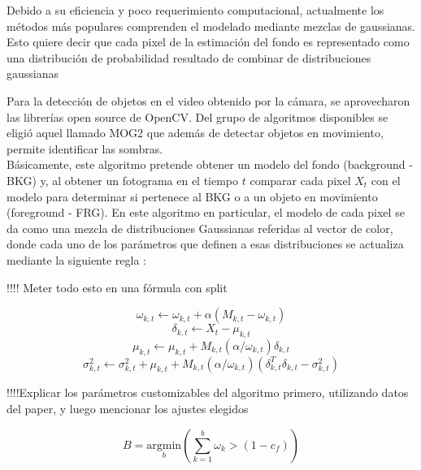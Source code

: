 \documentclass[12pt,a4paper]{article}
\begin{document}
Debido a su eficiencia y poco requerimiento computacional, actualmente los métodos más populares comprenden el modelado mediante mezclas de gaussianas. 
Esto quiere decir que cada pixel de la estimación del fondo es representado como una distribución de probabilidad resultado de combinar de distribuciones gaussianas






Para la detección de objetos en el video obtenido por la cámara, se aprovecharon las librerías open source de OpenCV. Del grupo de algoritmos disponibles se eligió aquel llamado MOG2 \cite{zivkovic2004} \cite{zivkovic2006} que además de detectar objetos en movimiento, permite identificar las sombras.
\\
Básicamente, este algoritmo pretende obtener un modelo del fondo (background - BKG) y, al obtener un fotograma en el tiempo $t$ comparar cada pixel $X_t$ con el modelo para determinar si pertenece al BKG o a un objeto en movimiento (foreground - FRG).
En este algoritmo en particular, el modelo de cada pixel se da como una mezcla de distribuciones Gaussianas referidas al vector de color, donde cada uno de los parámetros que definen a esas distribuciones se actualiza mediante la siguiente regla \cite{titterington1984}:

!!!! Meter todo esto en una fórmula con split

\begin{equation}
  \omega_{k,t} \leftarrow \omega_{k,t} + \alpha \left( M_{k,t} - \omega_{k,t}\right)
\end{equation}
\begin{equation}
  \delta_{k,t} \leftarrow X_t - \mu_{k,t}
\end{equation}
\begin{equation}
  \mu_{k,t} \leftarrow \mu_{k,t} + M_{k,t} \left( \alpha / \omega_{k,t} \right) \delta_{k,t}
\end{equation}
\begin{equation}
  \sigma^2_{k,t} \leftarrow \sigma^2_{k,t} + \mu_{k,t} + M_{k,t} \left( \alpha / \omega_{k,t} \right) \left( \delta^T_{k,t} \delta_{k,t} - \sigma^2_{k,t}\right)
\end{equation}

!!!!Explicar los parámetros customizables del algoritmo primero, utilizando datos del paper, y luego mencionar los ajustes elegidos

\begin{equation}
  B = \underset{b}{\text{argmin}}\left(\sum\limits^b_{k=1}\omega_k>(1-c_f)\right)
\end{equation}
\end{document}

